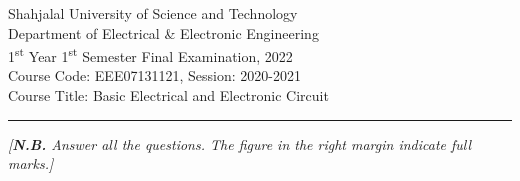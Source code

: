 
\begin{center}
	\Large{Shahjalal University of Science and Technology}\\
	\large{Department of Electrical \& Electronic Engineering}\\
	1\textsuperscript{st} Year 1\textsuperscript{st} Semester Final Examination, 2022\\
	Course Code: EEE07131121, Session: 2020-2021\\
	Course Title: Basic Electrical and Electronic Circuit\\
	
	
	
\end{center}

\vspace{1mm}
\noindent
{}

\vspace{-2.0mm}
\noindent\rule{\textwidth}{2pt}

\begin{center}
\vspace{-2.0mm}
\textit{[\textbf{N.B.} Answer all the questions. The figure in the right margin indicate full marks.]}
\end{center}
